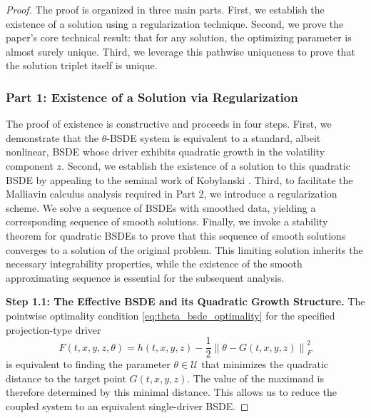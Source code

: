 \documentclass[12pt, letterpaper]{amsart}
\newcommand{\Ucal}{\mathcal{U}}
\newcommand{\norm}[1]{\left\lVert#1\right\rVert}
\theoremstyle{plain}
\theoremstyle{definition}
\theoremstyle{remark}
\numberwithin{equation}{section} %
\begin{document}
\begin{proof}
The proof is organized in three main parts. First, we establish the existence of a solution using a regularization technique. Second, we prove the paper's core technical result: that for any solution, the optimizing parameter is almost surely unique. Third, we leverage this pathwise uniqueness to prove that the solution triplet itself is unique.


\subsubsection*{\textbf{Part 1: Existence of a Solution via Regularization}}
The proof of existence is constructive and proceeds in four steps. First, we demonstrate that the \(\theta\)-BSDE system is equivalent to a standard, albeit nonlinear, BSDE whose driver exhibits quadratic growth in the volatility component \(z\). Second, we establish the existence of a solution to this quadratic BSDE by appealing to the seminal work of Kobylanski \cite{Kobylanski2000}. Third, to facilitate the Malliavin calculus analysis required in Part 2, we introduce a regularization scheme. We solve a sequence of BSDEs with smoothed data, yielding a corresponding sequence of smooth solutions. Finally, we invoke a stability theorem for quadratic BSDEs to prove that this sequence of smooth solutions converges to a solution of the original problem. This limiting solution inherits the necessary integrability properties, while the existence of the smooth approximating sequence is essential for the subsequent analysis.

\vspace{1ex}
\noindent\textbf{Step 1.1: The Effective BSDE and its Quadratic Growth Structure.}
The pointwise optimality condition \eqref{eq:theta_bsde_optimality} for the specified projection-type driver
\[ F(t,x,y,z,\theta) = h(t,x,y,z) - \frac{1}{2}\norm{\theta - G(t,x,y,z)}_F^2 \]
is equivalent to finding the parameter \(\theta \in \Ucal\) that minimizes the quadratic distance to the target point \(G(t,x,y,z)\). The value of the maximand is therefore determined by this minimal distance. This allows us to reduce the coupled system to an equivalent single-driver BSDE.


\end{proof}
\end{document}
